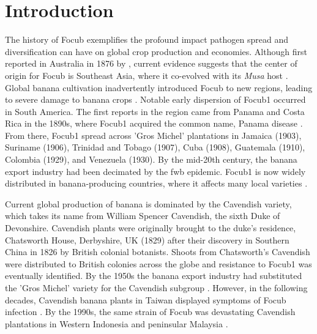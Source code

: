 
\section{Introduction}

The history of \acf{Focub} exemplifies the profound impact pathogen spread and diversification can have on global crop production and economies. Although first reported in Australia in 1876 by \textcite{Bancroft1876}, current evidence suggests that the center of origin for \ac{Focub} is Southeast Asia, where it co-evolved with its \textit{Musa} host \parencite{Maryani2019}. Global banana cultivation inadvertently introduced \ac{Focub} to new regions, leading to severe damage to banana crops \parencite{Kema2021}. Notable early dispersion of \acf{Focub1} occurred in South America. The first reports in the region came from Panama and Costa Rica in the 1890s, where \ac{Focub1} acquired the common name, Panama disease \parencite{Ashby1913}. From there, \ac{Focub1}  spread across 'Gros Michel' plantations in Jamaica (1903), Suriname (1906), Trinidad and Tobago (1907), Cuba (1908), Guatemala (1910), Colombia (1929), and Venezuela (1930). By the mid-20th century, the banana export industry had been decimated by the \ac{fwb} epidemic. \Ac{Focub1} is now widely distributed in banana-producing countries, where it affects many local varieties \parencite{Dita2018}.

Current global production of banana is dominated by the Cavendish variety, which takes its name from William Spencer Cavendish, the sixth Duke of Devonshire. Cavendish plants were originally brought to the duke's residence, Chatsworth House, Derbyshire, UK (1829) after their discovery in Southern China in 1826 by British colonial botanists. Shoots from Chatsworth's Cavendish were distributed to British colonies across the globe and resistance to \ac{Focub1} was eventually identified. By the 1950s the banana export industry had substituted the 'Gros Michel' variety for the Cavendish subgroup \parencite{Ploetz2005, Dita2018}. However, in the following decades, Cavendish banana plants in Taiwan displayed symptoms of \ac{Focub} infection \parencite{Agrios2005}. By the 1990s, the same strain of \ac{Focub} was devastating Cavendish plantations in Western Indonesia and peninsular Malaysia \parencite{Kema2021}. 

